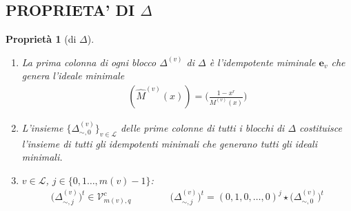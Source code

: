 \documentclass[mathserif]{beamer}
\def\quotient#1#2{%
   \raise1ex\hbox{$#1$}\Big/\lower1ex\hbox{$#2$}%
}
\newtheorem{prop}{Proprietà}
\begin{document}
\subsection{PROPRIETA' DI $\Delta$}

\begin{frame}
    \begin{prop}[di $\Delta$]
    \begin{enumerate}
      \item  La prima colonna di ogni blocco $\Delta^{(v)}$ di $\Delta$ è l'idempotente miminale $\mathbf{e}_{v}$ che genera l'ideale minimale 
      \begin{align*}
	  (\hat{M}^{(v)}(x)) = \Big(\frac{1-x^r}{M^{(v)}(x)} \Big)
      \end{align*}
      \item L'insieme $\lbrace \Delta_{\sim, 0}^{(v)} \rbrace_{v\in \mathscr{L}}$ delle prime colonne di tutti i blocchi di $\Delta$ costituisce l'insieme di tutti gli idempotenti minimali che generano tutti gli ideali minimali.
      \item  $v \in \mathscr{L}$, $j \in \lbrace 0, 1 \dots , m(v)-1 \rbrace$:
      \begin{align*}
      \big( \Delta_{\sim, j}^{(v)} \big)^{t} \in \mathcal{V}_{m(v), q}^{c} 
      \qquad \qquad 
      \big( \Delta_{\sim, j}^{(v)} \big)^{t}  =  (0,1,0,\dots,0)^{j} \star \big( \Delta_{\sim, 0}^{(v)} \big)^{t}  
      \end{align*}
    \end{enumerate}  
    \end{prop}
\end{frame}
\end{document}
